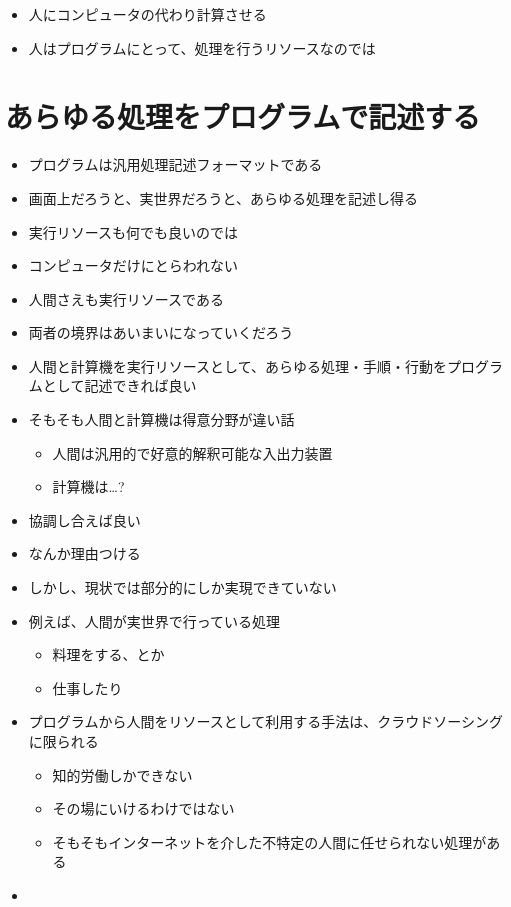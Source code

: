 \begin{itemize}
\itemsep1pt\parskip0pt
\item
  人にコンピュータの代わり計算させる
\item
  人はプログラムにとって、処理を行うリソースなのでは
\end{itemize}

\section{あらゆる処理をプログラムで記述する}\label{ux3042ux3089ux3086ux308bux51e6ux7406ux3092ux30d7ux30edux30b0ux30e9ux30e0ux3067ux8a18ux8ff0ux3059ux308b}

\begin{itemize}
\item
  プログラムは汎用処理記述フォーマットである
\item
  画面上だろうと、実世界だろうと、あらゆる処理を記述し得る
\item
  実行リソースも何でも良いのでは
\item
  コンピュータだけにとらわれない
\item
  人間さえも実行リソースである
\item
  両者の境界はあいまいになっていくだろう
\item
  人間と計算機を実行リソースとして、あらゆる処理・手順・行動をプログラムとして記述できれば良い
\item
  そもそも人間と計算機は得意分野が違い話

  \begin{itemize}
  \itemsep1pt\parskip0pt
  \item
    人間は汎用的で好意的解釈可能な入出力装置
  \item
    計算機は\ldots{}?
  \end{itemize}
\item
  協調し合えば良い
\item
  なんか理由つける
\item
  しかし、現状では部分的にしか実現できていない
\item
  例えば、人間が実世界で行っている処理

  \begin{itemize}
  \itemsep1pt\parskip0pt
  \item
    料理をする、とか
  \item
    仕事したり
  \end{itemize}
\item
  プログラムから人間をリソースとして利用する手法は、クラウドソーシングに限られる

  \begin{itemize}
  \itemsep1pt\parskip0pt
  \item
    知的労働しかできない
  \item
    その場にいけるわけではない
  \item
    そもそもインターネットを介した不特定の人間に任せられない処理がある
  \end{itemize}
\item
\end{itemize}

